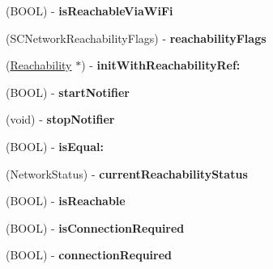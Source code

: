 \begin{DoxyCompactItemize}
\item 
\hypertarget{interface_reachability_a994f39db8e47480480ffd7ee81159ecb}{
(\-B\-O\-O\-L) -\/ {\bfseries is\-Reachable\-Via\-Wi\-Fi}}
\label{interface_reachability_a994f39db8e47480480ffd7ee81159ecb}

\item 
\hypertarget{interface_reachability_ac9080e40006cd8c82431a668ec8bfe18}{
(\-S\-C\-Network\-Reachability\-Flags) -\/ {\bfseries reachability\-Flags}}
\label{interface_reachability_ac9080e40006cd8c82431a668ec8bfe18}

\item 
\hypertarget{interface_reachability_af8dbb23cc7f9ac59b0269dfaf83979fc}{
(\hyperlink{interface_reachability}{\-Reachability} $\ast$) -\/ {\bfseries init\-With\-Reachability\-Ref\-:}}
\label{interface_reachability_af8dbb23cc7f9ac59b0269dfaf83979fc}

\item 
\hypertarget{interface_reachability_ae20732960a222681fcc7caeb191158bc}{
(\-B\-O\-O\-L) -\/ {\bfseries start\-Notifier}}
\label{interface_reachability_ae20732960a222681fcc7caeb191158bc}

\item 
\hypertarget{interface_reachability_ab7907e9c8de0e4e15774e82c089e0b39}{
(void) -\/ {\bfseries stop\-Notifier}}
\label{interface_reachability_ab7907e9c8de0e4e15774e82c089e0b39}

\item 
\hypertarget{interface_reachability_a7158fbf023168ca543a1340d6b3ce7fb}{
(\-B\-O\-O\-L) -\/ {\bfseries is\-Equal\-:}}
\label{interface_reachability_a7158fbf023168ca543a1340d6b3ce7fb}

\item 
\hypertarget{interface_reachability_a8396438436e7ff3770039fb527cd1d34}{
(\-Network\-Status) -\/ {\bfseries current\-Reachability\-Status}}
\label{interface_reachability_a8396438436e7ff3770039fb527cd1d34}

\item 
\hypertarget{interface_reachability_ae0b18fcacc97f538502cf671aa583dbd}{
(\-B\-O\-O\-L) -\/ {\bfseries is\-Reachable}}
\label{interface_reachability_ae0b18fcacc97f538502cf671aa583dbd}

\item 
\hypertarget{interface_reachability_a294f9407cd32a05f26a480871df70901}{
(\-B\-O\-O\-L) -\/ {\bfseries is\-Connection\-Required}}
\label{interface_reachability_a294f9407cd32a05f26a480871df70901}

\item 
\hypertarget{interface_reachability_a731496d70dd8bfbd1b364df13cac2b4c}{
(\-B\-O\-O\-L) -\/ {\bfseries connection\-Required}}
\label{interface_reachability_a731496d70dd8bfbd1b364df13cac2b4c}


\end{DoxyCompactItemize}
